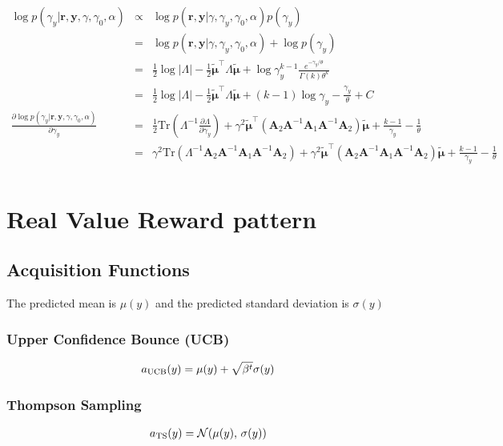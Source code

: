 \documentclass[platex, a4paper]{jsarticle}
\begin{document}
\begin{eqnarray}
  \log p(\gamma_y | \bm{r}, \bm{y},\gamma, \gamma_0, \alpha)
      &\propto& \log p( \bm{r}, \bm{y} | \gamma, \gamma_y, \gamma_0, \alpha)p(\gamma_y) \\
      &=& \log p( \bm{r}, \bm{y} | \gamma, \gamma_y, \gamma_0, \alpha) + \log p(\gamma_y) \\
      &=& \frac{1}{2} \log|\Lambda| - \frac{1}{2} \tilde{\bm{\mu}}^\top \Lambda \tilde{\bm{\mu}}
        + \log \gamma_y^{k-1} \frac{e^{-\gamma_y/\theta}}{\Gamma(k) \theta^k} \\
      &=& \frac{1}{2} \log|\Lambda| - \frac{1}{2} \tilde{\bm{\mu}}^\top \Lambda \tilde{\bm{\mu}}
        + (k-1)\log \gamma_y -  \frac{\gamma_y}{\theta} + C \\
  \frac{\partial \log p(\gamma_y | \bm{r}, \bm{y}, \gamma, \gamma_0, \alpha)}{\partial \gamma_y}
      &=& \frac{1}{2} \mathrm{Tr}( \Lambda^{-1} \frac{\partial \Lambda}{\partial \gamma_y})
        + \gamma^2   \tilde{\bm{\mu}}^\top \left(\bm{A}_2 \bm{A}^{-1} \bm{A}_1 \bm{A}^{-1} \bm{A}_2  \right)  \tilde{\bm{\mu}}
        + \frac{k-1}{\gamma_y} - \frac{1}{\theta} \\
      &=& \gamma^2 \mathrm{Tr}( \Lambda^{-1} \bm{A}_2 \bm{A}^{-1} \bm{A}_1 \bm{A}^{-1} \bm{A}_2)
        + \gamma^2  \tilde{\bm{\mu}}^\top \left(\bm{A}_2 \bm{A}^{-1} \bm{A}_1 \bm{A}^{-1} \bm{A}_2  \right)  \tilde{\bm{\mu}}
        + \frac{k-1}{\gamma_y} - \frac{1}{\theta} \\
\end{eqnarray}



\section{Real Value Reward pattern}
\subsection{Acquisition Functions}
The predicted mean is $\mu(y)$ and the predicted standard deviation is $\sigma(y)$

\subsubsection{Upper Confidence Bounce (UCB)}
\begin{eqnarray}
a_{\rm UCB}(y) = \mu(y) + \sqrt{\beta^t} \sigma(y)
\end{eqnarray}

\subsubsection{Thompson Sampling}
\begin{eqnarray}
a_{\rm TS}(y) = \mathcal{N}(\mu(y),\,\sigma(y))
\end{eqnarray}
\end{document}
